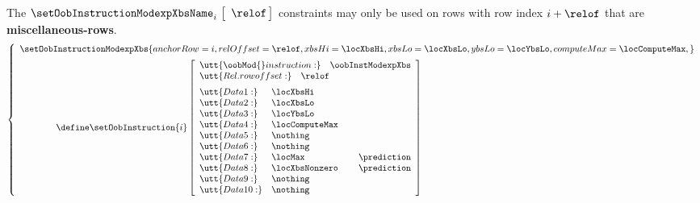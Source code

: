 \saNote{} The $\setOobInstructionModexpXbsName _{i} \big[ \, \relof \, \big]$ constraints may only be used on rows with row index $i + \relof$ that are \textbf{miscellaneous-rows}.
\[
        \left\{ \begin{array}{l}
                \setOobInstructionModexpXbs {
                        anchorRow    = i              ,
                        relOffset    = \relof         ,
                        xbsHi        = \locXbsHi      ,
                        xbsLo        = \locXbsLo      ,
                        ybsLo        = \locYbsLo      ,
                        computeMax   = \locComputeMax ,
                }
                \vspace{2mm} \\
                \qquad \qquad \define
                \setOobInstruction{i}
                \left[ \begin{array}{llr}
                        \multicolumn{3}{l}{\utt{\oobMod{} instruction:} \quad \oobInstModexpXbs} \\
                        \multicolumn{3}{l}{\utt{Rel. row offset:}            \quad \relof}         \vspace{2mm} \\
                        \utt{Data 1:}  & \locXbsHi      \\
                        \utt{Data 2:}  & \locXbsLo      \\
                        \utt{Data 3:}  & \locYbsLo      \\
                        \utt{Data 4:}  & \locComputeMax \\
                        \utt{Data 5:}  & \nothing       \\
                        \utt{Data 6:}  & \nothing       \\
                        \utt{Data 7:}  & \locMax         & \prediction \\
                        \utt{Data 8:}  & \locXbsNonzero  & \prediction \\
                        \utt{Data 9:}  & \nothing       \\
                        \utt{Data 10:} & \nothing       \\
                \end{array} \right] \\
        \end{array} \right.
\]
